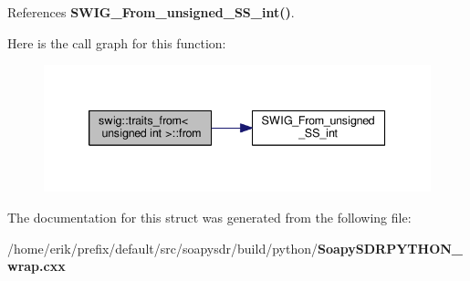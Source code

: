 References {\bf S\+W\+I\+G\+\_\+\+From\+\_\+unsigned\+\_\+\+S\+S\+\_\+int()}.



Here is the call graph for this function\+:
\nopagebreak
\begin{figure}[H]
\begin{center}
\leavevmode
\includegraphics[width=339pt]{d1/dc6/structswig_1_1traits__from_3_01unsigned_01int_01_4_a023fe4a0b88aa54e07c2611e52748846_cgraph}
\end{center}
\end{figure}




The documentation for this struct was generated from the following file\+:\begin{DoxyCompactItemize}
\item 
/home/erik/prefix/default/src/soapysdr/build/python/{\bf Soapy\+S\+D\+R\+P\+Y\+T\+H\+O\+N\+\_\+wrap.\+cxx}\end{DoxyCompactItemize}
